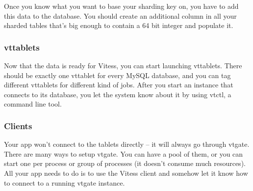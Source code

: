 Once you know what you want to base your sharding key on, you have to add this
data to the database. You should create an additional column in all your sharded
tables that’s big enough to contain a 64 bit integer and populate it.

\subsubsection{vttablets}\hypertarget{vttablets}{}\label{vttablets}

Now that the data is ready for Vitess, you can start launching vttablets. There
should be exactly one vttablet for every MySQL database, and you can tag
different vttablets for different kind of jobs. After you start an instance that
connects to its database, you let the system know about it by using vtctl, a
command line tool.

\subsubsection{Clients}\hypertarget{clients}{}\label{clients}

Your app won’t connect to the tablets directly – it will always go through
vtgate. There are many ways to setup vtgate. You can have a pool of them, or you
can start one per process or group of processes (it doesn’t consume much
resources). All your app needs to do is to use the Vitess client and somehow let
it know how to connect to a running vtgate instance.

